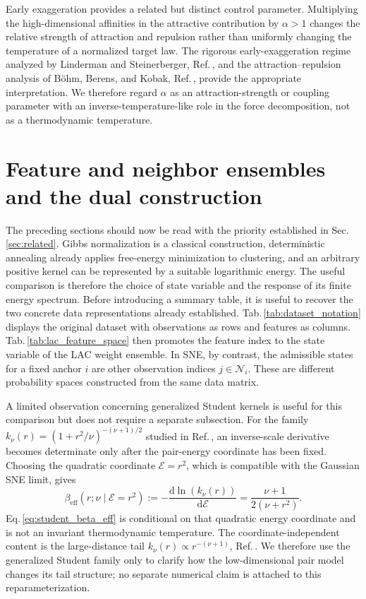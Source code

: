 \documentclass[11pt,a4paper]{article}
\theoremstyle{definition}
\theoremstyle{plain}
\begin{document}
Early exaggeration provides a related but distinct control parameter. Multiplying the high-dimensional affinities in the attractive contribution by $\alpha>1$ changes the relative strength of attraction and repulsion rather than uniformly changing the temperature of a normalized target law. The rigorous early-exaggeration regime analyzed by Linderman and Steinerberger, Ref.\,\cite{linderman2019provably}, and the attraction--repulsion analysis of B\"ohm, Berens, and Kobak, Ref.\,\cite{bohm2022spectrum}, provide the appropriate interpretation. We therefore regard $\alpha$ as an attraction-strength or coupling parameter with an inverse-temperature-like role in the force decomposition, not as a thermodynamic temperature.

\section{Feature and neighbor ensembles and the dual construction}
\label{sec:unified}

The preceding sections should now be read with the priority established in Sec.\,\ref{sec:related}. Gibbs normalization is a classical construction, deterministic annealing already applies free-energy minimization to clustering, and an arbitrary positive kernel can be represented by a suitable logarithmic energy. The useful comparison is therefore the choice of state variable and the response of its finite energy spectrum. Before introducing a summary table, it is useful to recover the two concrete data representations already established. Tab.\,\ref{tab:dataset_notation} displays the original dataset with observations as rows and features as columns. Tab.\,\ref{tab:lac_feature_space} then promotes the feature index to the state variable of the LAC weight ensemble. In SNE, by contrast, the admissible states for a fixed anchor $i$ are other observation indices $j\in\mathcal N_i$. These are different probability spaces constructed from the same data matrix.


A limited observation concerning generalized Student kernels is useful for this comparison but does not require a separate subsection. For the family $k_\nu(r)=\left(1+r^2/\nu\right)^{-(\nu+1)/2}$ studied in Ref.\,\cite{kobak2020heavy}, an inverse-scale derivative becomes determinate only after the pair-energy coordinate has been fixed. Choosing the quadratic coordinate $\mathcal E=r^2$, which is compatible with the Gaussian SNE limit, gives
\begin{equation}
    \beta_{\mathrm{eff}}(r;\nu\mid \mathcal E=r^2)
    :=-\frac{\mathrm d\ln\left(k_\nu(r)\right)}{\mathrm d\mathcal E}
    =\frac{\nu+1}{2\left(\nu+r^2\right)}.
    \label{eq:student_beta_eff}
\end{equation}
Eq.\,\eqref{eq:student_beta_eff} is conditional on that quadratic energy coordinate and is not an invariant thermodynamic temperature. The coordinate-independent content is the large-distance tail $k_\nu(r)\propto r^{-(\nu+1)}$, Ref.\,\cite{kobak2020heavy}. We therefore use the generalized Student family only to clarify how the low-dimensional pair model changes its tail structure; no separate numerical claim is attached to this reparameterization.
\end{document}

